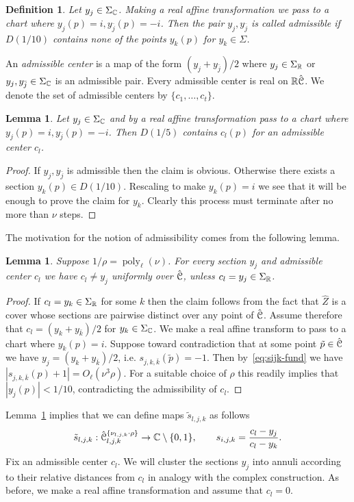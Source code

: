 \documentclass[reqno]{amsart}
\newtheorem{Lem}[Cor]{Lemma}{\bfseries}{\itshape}
\newtheorem{Def}[Cor]{Definition}{\bfseries}{\rmfamily}
\renewcommand\~[1]{\widetilde{#1}}
\def\poly{\operatorname{poly}} \def\J{\operatorname{J}}
\def\he#1{{\{#1\}}}
\begin{document}
\begin{Def}
  Let $y_j\in\Sigma_{\mathbb C}$. Making a real affine transformation we pass
  to a chart where $y_j(p)=i,y_{\bar j}(p)=-i$. Then the pair
  $y_j,y_{\bar j}$ is called \emph{admissible} if $D(1/10)$ contains
  none of the points $y_k(p)$ for $y_k\in\Sigma$.
\end{Def}
An \emph{admissible center} is a map of the form $(y_j+y_{\bar j})/2$
where $y_j\in\Sigma_{\mathbb R}$ or $y_j,y_{\bar j}\in\Sigma_{\mathbb C}$ is an
admissible pair. Every admissible center is real on ${\mathbb R}\hat{{\mathcal C}}$. We
denote the set of admissible centers by $\{c_1,\ldots,c_t\}$.
\begin{Lem}\label{lem:select-admissible}
  Let $y_j\in\Sigma_{\mathbb C}$ and by a real affine transformation pass to a
  chart where $y_j(p)=i,y_{\bar j}(p)=-i$. Then $D(1/5)$ contains
  $c_l(p)$ for an admissible center $c_l$.
\end{Lem}
\begin{proof}
  If $y_j,y_{\bar j}$ is admissible then the claim is
  obvious. Otherwise there exists a section
  $y_k(p)\in D(1/10)$. Rescaling to make $y_k(p)=i$ we see that it
  will be enough to prove the claim for $y_k$. Clearly this process
  must terminate after no more than $\nu$ steps.
\end{proof}

The motivation for the notion of admissibility comes from the
following lemma.

\begin{Lem}\label{lem:admissible-collision}
  Suppose $1/\rho=\poly_\ell(\nu)$. For every section $y_j$ and
  admissible center $c_l$ we have $c_l\neq y_j$ uniformly over
  $\hat{{\mathcal C}}$, unless $c_l=y_j\in\Sigma_{\mathbb R}$.
\end{Lem}
\begin{proof}
  If $c_l=y_k\in\Sigma_{\mathbb R}$ for some $k$ then the claim follows from
  the fact that $\hat Z$ is a cover whose sections are pairwise
  distinct over any point of $\hat{{\mathcal C}}$. Assume therefore that
  $c_l=(y_k+y_{\bar k})/2$ for $y_k\in\Sigma_{\mathbb C}$. We make a real
  affine transform to pass to a chart where $y_k(p)=i$. Suppose toward
  contradiction that at some point $\tilde p\in\hat{{\mathcal C}}$ we have
  $y_j=(y_k+y_{\bar k})/2$, i.e. $s_{j,k,\bar k}(\tilde p)=-1$. Then
  by~\eqref{eq:sijk-fund} we have
  $|s_{j,k,\bar k}(p)+1|=O_\ell(\nu^3\rho)$. For a suitable choice of
  $\rho$ this readily implies that $|y_j(p)|<1/10$, contradicting the
  admissibility of $c_l$.
\end{proof}

Lemma~\ref{lem:admissible-collision} implies that we can define maps
$\tilde s_{l,j,k}$ as follows
\begin{equation}
  \tilde s_{l,j,k}:\hat\cC_{l,j,k}^{\he{\nu_{l,j,k}\cdot\rho}}\to\C\setminus\{0,1\}, \qquad s_{i,j,k}=\frac{c_l-y_j}{c_l-y_k}.
\end{equation}
Fix an admissible center $c_l$. We will cluster the sections $y_j$
into annuli according to their relative distances from $c_l$ in
analogy with the complex construction. As before, we make a real
affine transformation and assume that $c_l=0$.
\end{document}
